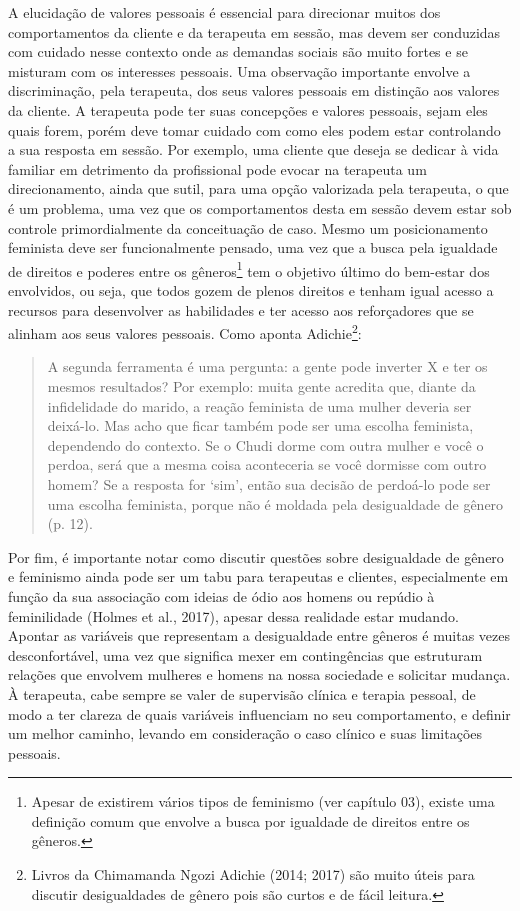 A elucidação de valores pessoais é essencial para direcionar muitos dos comportamentos da cliente e da terapeuta em sessão, mas devem ser conduzidas com cuidado nesse contexto onde as demandas sociais são muito fortes e se misturam com os interesses pessoais. Uma observação importante envolve a discriminação, pela terapeuta, dos seus valores pessoais em distinção aos valores da cliente. A terapeuta pode ter suas concepções e valores pessoais, sejam eles quais forem, porém deve tomar cuidado com como eles podem estar controlando a sua resposta em sessão. Por exemplo, uma cliente que deseja se dedicar à vida familiar em detrimento da profissional pode evocar na terapeuta um direcionamento, ainda que sutil, para uma opção valorizada pela terapeuta, o que é um problema, uma vez que os comportamentos desta em sessão devem estar sob controle primordialmente da conceituação de caso. Mesmo um posicionamento feminista deve ser funcionalmente pensado, uma vez que a busca pela igualdade de direitos e poderes entre os gêneros\footnote{Apesar de existirem vários tipos de feminismo (ver capítulo 03), existe uma definição comum que envolve a busca por igualdade de direitos entre os gêneros.} tem o objetivo último do bem-estar dos envolvidos, ou seja, que todos gozem de plenos direitos e tenham igual acesso a recursos para desenvolver as habilidades e ter acesso aos reforçadores que se alinham aos seus valores pessoais. Como aponta Adichie\footnote{Livros da Chimamanda Ngozi Adichie (2014; 2017) são muito úteis para discutir desigualdades de gênero pois são curtos e de fácil leitura.}:

\begin{quote}
    A segunda ferramenta é uma pergunta: a gente pode inverter X e ter os mesmos resultados? Por exemplo: muita gente acredita que, diante da infidelidade do marido, a reação feminista de uma mulher deveria ser deixá-lo. Mas acho que ficar também pode ser uma escolha feminista, dependendo do contexto. Se o Chudi dorme com outra mulher e você o perdoa, será que a mesma coisa aconteceria se você dormisse com outro homem? Se a resposta for ‘sim’, então sua decisão de perdoá-lo pode ser uma escolha feminista, porque não é moldada pela desigualdade de gênero (p. 12).
\end{quote}

Por fim, é importante notar como discutir questões sobre desigualdade de gênero e feminismo ainda pode ser um tabu para terapeutas e clientes, especialmente em função da sua associação com ideias de ódio aos homens ou repúdio à feminilidade (Holmes et al., 2017), apesar dessa realidade estar mudando. Apontar as variáveis que representam a desigualdade entre gêneros é muitas vezes desconfortável, uma vez que significa mexer em contingências que estruturam relações que envolvem mulheres e homens na nossa sociedade e solicitar mudança. À terapeuta, cabe sempre se valer de supervisão clínica e terapia pessoal, de modo a ter clareza de quais variáveis influenciam no seu comportamento, e definir um melhor caminho, levando em consideração o caso clínico e suas limitações pessoais.

